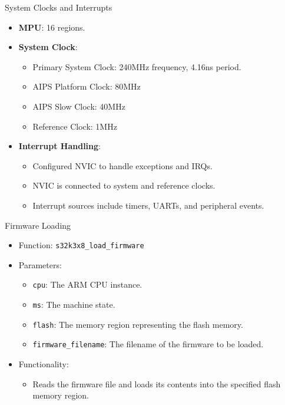 \begin{frame}{System Clocks and Interrupts}
    \begin{itemize}
        \item \textbf{MPU}: 16 regions.
        \item \textbf{System Clock}:
        \begin{itemize}
            \item Primary System Clock: 240MHz frequency, 4.16ns period.
            \item AIPS Platform Clock: 80MHz
            \item AIPS Slow Clock: 40MHz
            \item Reference Clock: 1MHz
        \end{itemize}
        \item \textbf{Interrupt Handling}:
        \begin{itemize}
            \item Configured NVIC to handle exceptions and IRQs.
            \item NVIC is connected to system and reference clocks.
            \item Interrupt sources include timers, UARTs, and peripheral events.
        \end{itemize}
    \end{itemize}
\end{frame}

\begin{frame}{Firmware Loading}
    \begin{itemize}
        \item Function: \texttt{s32k3x8\_load\_firmware}
        \item Parameters:
        \begin{itemize}
            \item \texttt{cpu}: The ARM CPU instance.
            \item \texttt{ms}: The machine state.
            \item \texttt{flash}: The memory region representing the flash memory.
            \item \texttt{firmware\_filename}: The filename of the firmware to be loaded.
        \end{itemize}
        \item Functionality:
        \begin{itemize}
            \item Reads the firmware file and loads its contents into the specified flash memory region.
        \end{itemize}
    \end{itemize}
\end{frame}

